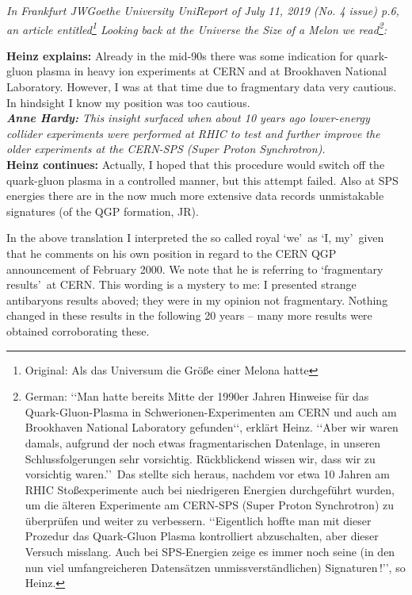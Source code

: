 \noindent \textit{In Frankfurt JWGoethe University UniReport of July 11, 2019 (No. 4 issue) p.6, an article entitled\footnote{Original: Als das Universum die Gr\"o\ss e einer Melona hatte} \textit{Looking back at the Universe the Size of a Melon} we read\footnote{German: \lq\lq Man hatte bereits Mitte der 1990er Jahren Hinweise f\"ur das Quark-Gluon-Plasma in Schwerionen-Experimenten am CERN und auch am Brookhaven National Laboratory gefunden\lq\lq, erkl\"art Heinz. \lq\lq Aber wir waren damals, aufgrund der noch etwas fragmentarischen Datenlage, in unseren Schlussfolgerungen sehr vorsichtig. R\"uckblickend wissen wir, dass wir zu vorsichtig waren.\rq\rq\ Das stellte sich heraus, nachdem vor etwa 10 Jahren am RHIC Sto\ss experimente auch bei niedrigeren Energien durchgef\"uhrt wurden, um die \"alteren Experimente am CERN-SPS (Super Proton Synchrotron) zu \"uberpr\"ufen und weiter zu verbessern. \lq\lq Eigentlich hoffte man mit dieser Prozedur das Quark-Gluon Plasma kontrolliert abzuschalten, aber dieser Versuch misslang. Auch bei SPS-Energien zeige es immer noch seine (in den nun viel umfangreicheren Datens\"atzen unmissverst\"andlichen) 
Signaturen\,!\rq\rq, so Heinz.}:}%
%
\begin{mdframed}[linecolor=gray,roundcorner=12pt,backgroundcolor=GreenYellow!15,linewidth=1pt,leftmargin=0cm,rightmargin=0cm,topline=true,bottomline=true,skipabove=12pt]\relax%
%
{\bf Heinz explains:}\label{Heinz2019} Already in the mid-90s there was some indication for quark-gluon plasma in heavy ion experiments at CERN and at Brookhaven National Laboratory. However, I was at that time due to fragmentary data very cautious. In hindsight I know my position was too cautious.\\ 
{\it \textbf{Anne Hardy:} This insight surfaced when about 10 years ago lower-energy collider experiments were performed at RHIC to test and further improve the older experiments at the CERN-SPS (Super Proton Synchrotron).}\\
{\bf Heinz continues:} Actually, I hoped that this procedure would switch off the quark-gluon plasma in a controlled manner, but this attempt failed. Also at SPS energies there are in the now much more extensive data records unmistakable signatures (of the QGP formation, JR).
%
\end{mdframed}

In the above translation I interpreted the so called royal \lq we\rq\ as \lq I, my\rq\ given that he comments on his own position in regard to the CERN QGP announcement of February 2000. We note that he is referring to \lq fragmentary results\rq\ at CERN. This wording is a mystery to me: I presented strange antibaryons results aboved; they were in my opinion not fragmentary. Nothing changed in these results in the following 20 years -- many more results were obtained corroborating these.

